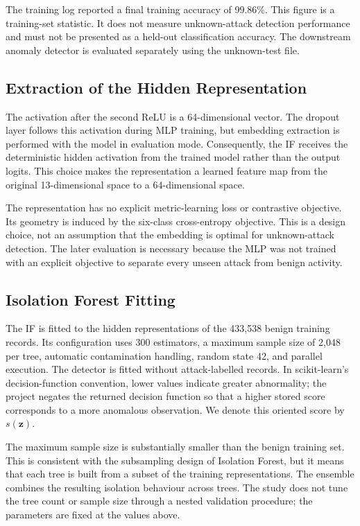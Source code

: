 \documentclass[journal]{IEEEtran}
\begin{document}
The training log reported a final training accuracy of 99.86\%. This figure is a training-set statistic. It does not measure unknown-attack detection performance and must not be presented as a held-out classification accuracy. The downstream anomaly detector is evaluated separately using the unknown-test file.

\subsection{Extraction of the Hidden Representation}
The activation after the second ReLU is a 64-dimensional vector. The dropout layer follows this activation during MLP training, but embedding extraction is performed with the model in evaluation mode. Consequently, the IF receives the deterministic hidden activation from the trained model rather than the output logits. This choice makes the representation a learned feature map from the original 13-dimensional space to a 64-dimensional space.

The representation has no explicit metric-learning loss or contrastive objective. Its geometry is induced by the six-class cross-entropy objective. This is a design choice, not an assumption that the embedding is optimal for unknown-attack detection. The later evaluation is necessary because the MLP was not trained with an explicit objective to separate every unseen attack from benign activity.

\subsection{Isolation Forest Fitting}
The IF is fitted to the hidden representations of the 433,538 benign training records. Its configuration uses 300 estimators, a maximum sample size of 2,048 per tree, automatic contamination handling, random state 42, and parallel execution. The detector is fitted without attack-labelled records. In scikit-learn's decision-function convention, lower values indicate greater abnormality; the project negates the returned decision function so that a higher stored score corresponds to a more anomalous observation. We denote this oriented score by $s(\mathbf{z})$.

The maximum sample size is substantially smaller than the benign training set. This is consistent with the subsampling design of Isolation Forest, but it means that each tree is built from a subset of the training representations. The ensemble combines the resulting isolation behaviour across trees. The study does not tune the tree count or sample size through a nested validation procedure; the parameters are fixed at the values above.
\end{document}
